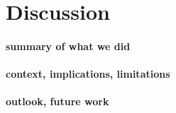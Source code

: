 \documentclass{article}
\begin{document}
\section{Discussion}

\paragraph{summary of what we did}

\paragraph{context, implications, limitations}

\paragraph{outlook, future work}


 




\newpage
\end{document}

